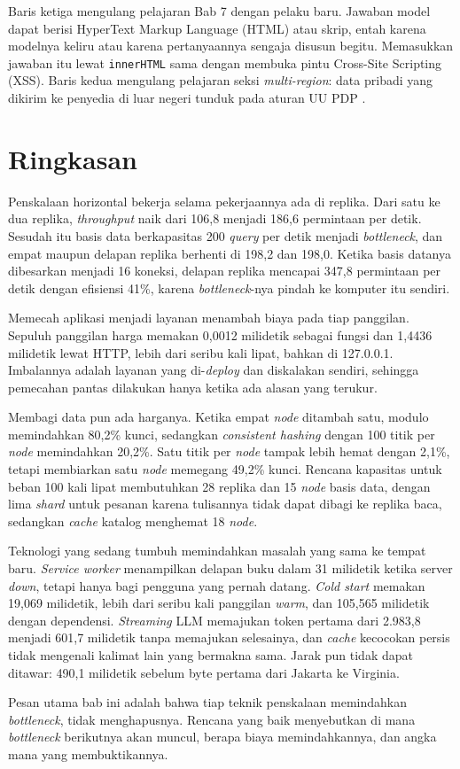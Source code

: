 Baris ketiga mengulang pelajaran Bab 7 dengan pelaku baru. Jawaban model
dapat berisi HyperText Markup Language (HTML) atau skrip, entah karena
modelnya keliru atau karena pertanyaannya sengaja disusun begitu. Memasukkan
jawaban itu lewat \texttt{innerHTML} sama dengan membuka pintu
Cross-Site Scripting (XSS). Baris kedua mengulang pelajaran seksi
\textit{multi-region}: data pribadi yang dikirim ke penyedia di luar negeri
tunduk pada aturan UU PDP \cite{uu-pdp-2022}.

\section{Ringkasan}

Penskalaan horizontal bekerja selama pekerjaannya ada di replika. Dari satu
ke dua replika, \textit{throughput} naik dari 106,8 menjadi 186,6 permintaan
per detik. Sesudah itu basis data berkapasitas 200 \textit{query} per detik
menjadi \textit{bottleneck}, dan empat maupun delapan replika berhenti di
198,2 dan 198,0. Ketika basis datanya dibesarkan menjadi 16 koneksi, delapan
replika mencapai 347,8 permintaan per detik dengan efisiensi 41\%, karena
\textit{bottleneck}-nya pindah ke komputer itu sendiri.

Memecah aplikasi menjadi layanan menambah biaya pada tiap panggilan.
Sepuluh panggilan harga memakan 0,0012 milidetik sebagai fungsi dan 1,4436
milidetik lewat HTTP, lebih dari seribu kali lipat, bahkan di 127.0.0.1.
Imbalannya adalah layanan yang di-\textit{deploy} dan diskalakan sendiri,
sehingga pemecahan pantas dilakukan hanya ketika ada alasan yang terukur.

Membagi data pun ada harganya. Ketika empat \textit{node} ditambah satu, modulo
memindahkan 80,2\% kunci, sedangkan \textit{consistent hashing} dengan 100
titik per \textit{node} memindahkan 20,2\%. Satu titik per \textit{node} tampak lebih hemat
dengan 2,1\%, tetapi membiarkan satu \textit{node} memegang 49,2\% kunci. Rencana
kapasitas untuk beban 100 kali lipat membutuhkan 28 replika dan 15 \textit{node} basis
data, dengan lima \textit{shard} untuk pesanan karena tulisannya tidak dapat
dibagi ke replika baca, sedangkan \textit{cache} katalog menghemat 18 \textit{node}.

Teknologi yang sedang tumbuh memindahkan masalah yang sama ke tempat baru.
\textit{Service worker} menampilkan delapan buku dalam 31 milidetik ketika
server \textit{down}, tetapi hanya bagi pengguna yang pernah datang. \textit{Cold
start} memakan 19,069 milidetik, lebih dari seribu kali panggilan
\textit{warm}, dan 105,565 milidetik dengan dependensi. \textit{Streaming}
LLM memajukan token pertama dari 2.983,8 menjadi 601,7 milidetik tanpa
memajukan selesainya, dan \textit{cache} kecocokan persis tidak mengenali
kalimat lain yang bermakna sama. Jarak pun tidak dapat ditawar: 490,1
milidetik sebelum byte pertama dari Jakarta ke Virginia.

Pesan utama bab ini adalah bahwa tiap teknik penskalaan memindahkan
\textit{bottleneck}, tidak menghapusnya. Rencana yang baik menyebutkan di
mana \textit{bottleneck} berikutnya akan muncul, berapa biaya
memindahkannya, dan angka mana yang membuktikannya.
